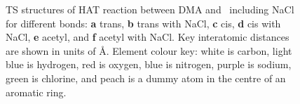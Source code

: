 \begin{figure}[!htbp]\ContinuedFloat

  \caption[TS structures of HAT reaction between DMA and \cumo\ including and
  excluding NaCl.]{TS structures of HAT reaction between DMA and \cumo\
  including NaCl for different  bonds: \textbf{a} trans, \textbf{b}
  trans with NaCl, \textbf{c} cis, \textbf{d} cis with NaCl, \textbf{e} acetyl,
  and \textbf{f} acetyl with NaCl. Key interatomic distances are shown in units
  of \AA. Element colour key: white is carbon, light blue is hydrogen, red is
  oxygen, blue is nitrogen, purple is sodium, green is chlorine, and peach is a
  dummy atom in the centre of an aromatic ring.} \label{fig:dma-cumo-ts}
\end{figure}

